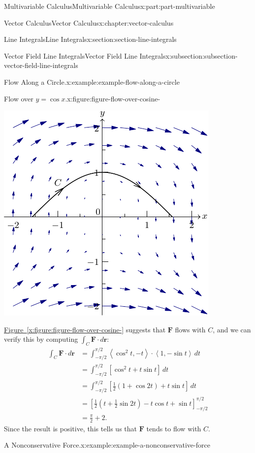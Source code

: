 \documentclass[twoside,10pt,]{tufte-book}
\newcommand{\xreffont}{\relax}
\numberwithin{equation}{part}
\newcommand{\vb}[1]{\mathbf{#1}}
\newcommand{\dotprod}[1]{\left\langle #1 \right\rangle}
\newcommand{\brackets}[1]{\left[ #1 \right]}
\newcommand{\parens}[1]{\left( #1 \right)}
\newcommand{\amp}{&}
\begin{document}
\begin{partptx}{Multivariable Calculus}{}{Multivariable Calculus}{}{}{x:part:part-multivariable}
\begin{chapterptx}{Vector Calculus}{}{Vector Calculus}{}{}{x:chapter:vector-calculus}
\begin{sectionptx}{Line Integrals}{}{Line Integrals}{}{}{x:section:section-line-integrals}
\begin{subsectionptx}{Vector Field Line Integrals}{}{Vector Field Line Integrals}{}{}{x:subsection:subsection-vector-field-line-integrals}
\begin{example}{Flow Along a Circle.}{x:example:example-flow-along-a-circle}
\begin{figureptx}{Flow over \(y = \cos x\).}{x:figure:figure-flow-over-cosine-}{}
\begin{image}{0}{1}{0}
\includegraphics[width=\linewidth]{generated/asymptote/image-flow-over-cosine-.pdf}
\end{image}%
\tcblower
\end{figureptx}%
%
\par
\hyperref[x:figure:figure-flow-over-cosine-]{Figure~{\xreffont\ref{x:figure:figure-flow-over-cosine-}}} suggests that \(\vb{F}\) flows with \(C\), and we can verify this by computing \(\int_{C}\vb{F}\cdot d\vb{r}\):%
\begin{align*}
\int_{C}\vb{F}\cdot d\vb{r} \amp = \int_{-\pi/2}^{\pi/2} \dotprod{\cos^{2}t, -t}\cdot\dotprod{1,-\sin t}\,dt\\
\amp = \int_{-\pi/2}^{\pi/2} \brackets{\cos^{2}t + t\sin t}\,dt\\
\amp = \int_{-\pi/2}^{\pi/2} \brackets{ \frac{1}{2}\parens{1 + \cos 2t} + t\sin t}\,dt \\
\amp = \brackets{\frac{1}{2}\parens{ t + \frac{1}{2}\sin 2t} - t\cos t + \sin t}_{-\pi/2}^{\pi/2} \\
\amp = \frac{\pi}{2} + 2 \text{.}
\end{align*}
Since the result is positive, this tells us that \(\vb{F}\) tends to flow with \(C\).%
\end{example}
\begin{example}{A Nonconservative Force.}{x:example:example-a-nonconservative-force}%

\end{example}
\end{subsectionptx}
\end{sectionptx}
\end{chapterptx}
\end{partptx}
\end{document}
